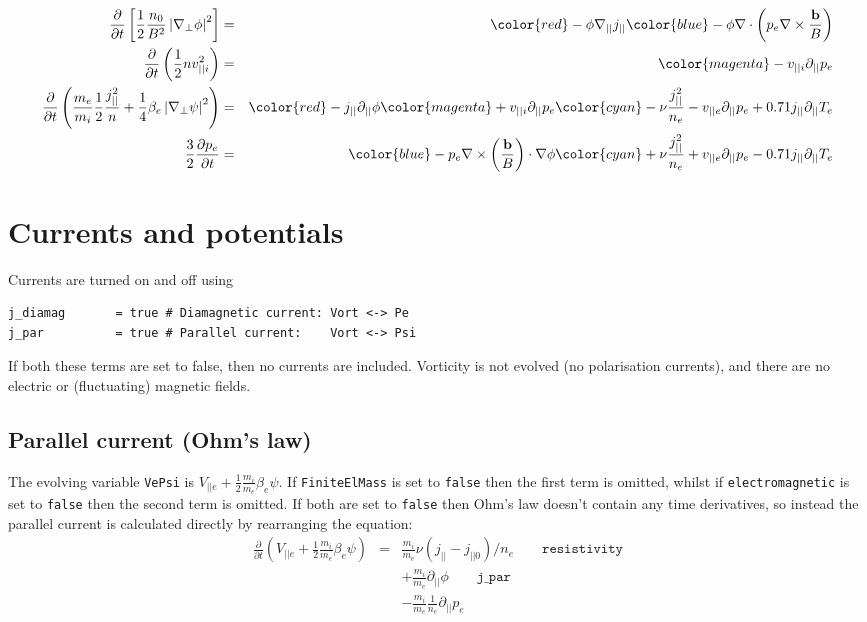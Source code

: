 \documentclass[12pt,a4paper]{article}
\newcommand{\deriv}[2]{\frac{\partial #1}{\partial #2}}
\begin{document}
\begin{eqnarray*}
  \frac{\partial}{\partial t}\left[\frac{1}{2}\frac{n_0}{B^2}\left|\nabla_\perp\phi\right|^2\right] &=& {\color{red} -\phi\nabla_{||}j_{||}} {\color{blue} - \phi\nabla\cdot\left(p_e\nabla\times\frac{\mathbf{b}}{B}\right)} \\
  \frac{\partial}{\partial t}\left(\frac{1}{2}nv_{||i}^2\right) &=& {\color{magenta} - v_{||i}\partial_{||}p_e} \\
  \frac{\partial}{\partial t}\left(\frac{m_e}{m_i}\frac{1}{2}\frac{j_{||}^2}{n} + \frac{1}{4}\beta_e\left|\nabla_\perp\psi\right|^2\right) &=& {\color{red} - j_{||}\partial_{||}\phi} {\color{magenta} + v_{||i}\partial_{||}p_e} {\color{cyan} - \nu \frac{j_{||}^2}{n_e} - v_{||e}\partial_{||}p_e + 0.71j_{||}\partial_{||}T_e} \\
  \frac{3}{2}\deriv{p_e}{t} &=& {\color{blue} -p_e\nabla\times\left(\frac{\mathbf{b}}{B}\right)\cdot\nabla\phi} {\color{cyan} + \nu \frac{j_{||}^2}{n_e} + v_{||e}\partial_{||}p_e - 0.71 j_{||}\partial_{||} T_e}
\end{eqnarray*}

\section{Currents and potentials}

Currents are turned on and off using
\begin{verbatim}
j_diamag       = true # Diamagnetic current: Vort <-> Pe
j_par          = true # Parallel current:    Vort <-> Psi
\end{verbatim}

If both these terms are set to false, then no currents are included. 
Vorticity is not evolved (no polarisation currents), and 
there are no electric or (fluctuating) magnetic fields.

\subsection{Parallel current (Ohm's law)}

The evolving variable \texttt{VePsi} is $V_{||e} + \frac{1}{2}\frac{m_i}{m_e}\beta_e\psi$. If \texttt{FiniteElMass} is set to \texttt{false} then the first term is omitted, whilst if \texttt{electromagnetic} is set to \texttt{false} then the second term is omitted. If both are set to \texttt{false} then Ohm's law doesn't contain any time derivatives, so instead the parallel current is calculated directly by rearranging the equation:
\begin{eqnarray}
  \frac{\partial}{\partial t}\left(V_{||e} + \frac{1}{2}\frac{m_i}{m_e}\beta_e\psi\right) &=& \frac{m_i}{m_e}\nu\left(j_{||} - j_{||0}\right)/n_e \qquad \texttt{resistivity} \\
  && + \frac{m_i}{m_e}\partial_{||}\phi \qquad \texttt{j\_par} \\
  && - \frac{m_i}{m_e}\frac{1}{n_e}\partial_{||} p_e 
\end{eqnarray}
\end{document}
